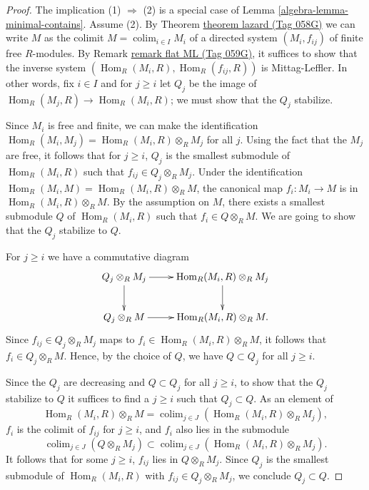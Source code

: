 \documentclass{amsart}
\theoremstyle{plain}
\theoremstyle{definition}
\theoremstyle{remark}
\numberwithin{equation}{subsection}
\def\colim{\mathop{\mathrm{colim}}\nolimits}
\def\Hom{\mathop{\mathrm{Hom}}\nolimits}
\begin{document}
\begin{proof}
The implication (1) $\Rightarrow$ (2) is a special case of
Lemma \ref{algebra-lemma-minimal-contains}. Assume (2).
By Theorem \href{https://stacks.math.columbia.edu/tag/058G}{theorem lazard (Tag 058G)} we can write $M$ as the colimit
$M = \colim_{i \in I} M_i$ of a directed system $(M_i, f_{ij})$ of
finite free $R$-modules.
By Remark \href{https://stacks.math.columbia.edu/tag/059G}{remark flat ML (Tag 059G)}, it suffices to show that the inverse system
$(\Hom_R(M_i, R), \Hom_R(f_{ij}, R))$ is Mittag-Leffler.  In
other words,
fix $i \in I$ and for $j \geq i$ let $Q_j$ be the image of
$\Hom_R(M_j, R)
\to \Hom_R(M_i, R)$; we must show that the $Q_j$ stabilize.

\medskip\noindent
Since $M_i$ is free and finite, we can make the identification
$\Hom_R(M_i, M_j) = \Hom_R(M_i, R) \otimes_R  M_j$ for all $j$.
 Using the
fact that the $M_j$ are free, it follows that for $j \geq i$, $Q_j$ is the
smallest submodule of $\Hom_R(M_i, R)$ such that $f_{ij} \in Q_j
\otimes_R
M_j$.  Under the identification $\Hom_R(M_i, M) = \Hom_R(M_i, R)
\otimes_R
M$, the canonical map $f_i: M_i \to M$ is in $\Hom_R(M_i, R)
\otimes_R M$.  By the assumption on $M$, there exists a smallest submodule
$Q$ of $\Hom_R(M_i, R)$ such that $f_i \in Q \otimes_R M$.  We are
going to
show that the $Q_j$ stabilize to $Q$.

\medskip\noindent
For $j \geq i$ we have a commutative diagram
$$
\xymatrix{
Q_j \otimes_R M_j \ar[r] \ar[d] & \Hom_R(M_i, R) \otimes_R M_j
\ar[d] \\
Q_j \otimes_R M \ar[r] & \Hom_R(M_i, R) \otimes_R M.
}
$$
Since $f_{ij} \in Q_j \otimes_R M_j$ maps to $f_i \in \Hom_R(M_i, R)
\otimes_R M$, it follows that $f_i \in Q_j \otimes_R M$.  Hence, by the
choice of $Q$, we have $Q \subset Q_j$ for all $j \geq i$.

\medskip\noindent
Since the $Q_j$ are decreasing and $Q \subset Q_j$ for all $j \geq i$, to show
that the $Q_j$ stabilize to $Q$ it suffices to find a $j \geq i$ such that $Q_j
\subset Q$.  As an element of
$$
\Hom_R(M_i, R) \otimes_R M = \colim_{j \in J}
(\Hom_R(M_i, R) \otimes_R
M_j),
$$
$f_i$ is the colimit of $f_{ij}$ for $j \geq i$, and $f_i$ also lies in the
submodule
$$
\colim_{j \in J} (Q \otimes_R M_j) \subset \colim_{j \in J}
(\Hom_R(M_i, R)
\otimes_R M_j).
$$
It follows that for some $j \geq i$, $f_{ij}$ lies in $Q \otimes_R M_j$.
Since $Q_j$ is the smallest submodule of $\Hom_R(M_i, R)$ with $f_{ij}
\in
Q_j \otimes_R M_j$, we conclude $Q_j\subset Q$.
\end{proof}
\end{document}
